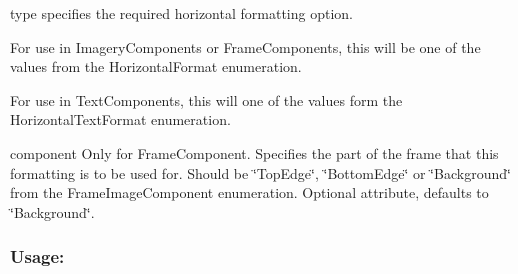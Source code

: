 \begin{DoxyItemize}
\item {\ttfamily type} specifies the required horizontal formatting option. 
\begin{DoxyItemize}
\item For use in Imagery\+Components or Frame\+Components, this will be one of the values from the Horizontal\+Format enumeration. 
\item For use in Text\+Components, this will one of the values form the Horizontal\+Text\+Format enumeration. 
\end{DoxyItemize}
\item {\ttfamily component} Only for Frame\+Component. Specifies the part of the frame that this formatting is to be used for. Should be \char`\"{}\+Top\+Edge\char`\"{}, \char`\"{}\+Bottom\+Edge\char`\"{} or \char`\"{}\+Background\char`\"{} from the Frame\+Image\+Component enumeration. Optional attribute, defaults to \char`\"{}\+Background\char`\"{}. 
\end{DoxyItemize}\hypertarget{fal_element_ref_fal_elem_ref_sec_16_3}{}\subsubsection{Usage\+:}\label{fal_element_ref_fal_elem_ref_sec_16_3}

